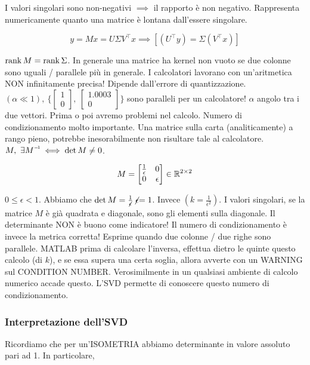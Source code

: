 I valori singolari sono non-negativi $\implies$ il rapporto è non negativo. Rappresenta numericamente quanto una matrice è lontana dall'essere singolare.

\[
	y=Mx=U\Sigma V^\top x \implies [(U^\top y)=\Sigma(V^\top x)]
\]

$\operatorname{rank}{M}=\operatorname{rank}{\Sigma}$. In generale una matrice ha kernel non vuoto se due colonne sono uguali / parallele più in generale. I calcolatori lavorano con un'aritmetica NON infinitamente precisa! Dipende dall'errore di quantizzazione. $(\alpha\ll 1),\ \{\begin{bmatrix}1\\0\end{bmatrix},\ \begin{bmatrix}1.0003\\0\end{bmatrix}\}$ sono paralleli per un calcolatore! $\alpha$ angolo tra i due vettori. Prima o poi avremo problemi nel calcolo. Numero di condizionamento molto importante. Una matrice sulla carta (analiticamente) a rango pieno, potrebbe inesorabilmente non risultare tale al calcolatore. $M,\ \exists\inv{M}\iff \det{M}\neq 0$. 

\[
	M = \begin{bmatrix}\frac{1}{\epsilon}&0\\0&\epsilon\end{bmatrix}\in\mathbb{R}^{2\times 2}
\]

$0\leq\epsilon<1$. Abbiamo che $\det{M}=\frac{1}{\centernot{\epsilon}}\centernot{\epsilon}=1$. Invece $(k=\frac{1}{\epsilon^2})$. I valori singolari, se la matrice $M$ è già quadrata e diagonale, sono gli elementi sulla diagonale. Il determinante NON è buono come indicatore! Il numero di condizionamento è invece la metrica corretta! Esprime quando due colonne / due righe sono parallele. MATLAB prima di calcolare l'inversa, effettua dietro le quinte questo calcolo (di $k$), e se essa supera una certa soglia, allora avverte con un WARNING sul CONDITION NUMBER. Verosimilmente in un qualsiasi ambiente di calcolo numerico accade questo. L'SVD permette di conoscere questo numero di condizionamento.

\subsubsection{Interpretazione dell'SVD}

Ricordiamo che per un'ISOMETRIA abbiamo determinante in valore assoluto pari ad 1. In particolare,

